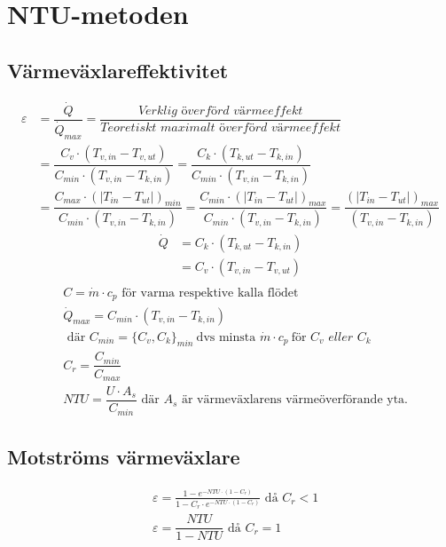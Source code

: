 	\section*{NTU-metoden}
	\subsection*{Värmeväxlareffektivitet}
	\begin{align*}
		\varepsilon & = \dfrac{\dot{Q}}{\dot{Q}_{max}}=
		\dfrac{\textit{Verklig överförd värmeeffekt}}{\textit{Teoretiskt maximalt överförd värmeeffekt}} \\
		& = \dfrac{C_v \cdot (T_{v,in} - T_{v,ut})}{C_{min} \cdot (T_{v,in} - T_{k,in})}
		 = \dfrac{C_k \cdot (T_{k,ut} - T_{k,in})}{C_{min} \cdot (T_{v,in} - T_{k,in})} \\
		& = \dfrac{C_{max} \cdot (\left| T_{in} - T_{ut}\right|)_{min}}{C_{min} \cdot (T_{v,in} - T_{k,in})}
		= \dfrac{C_{min} \cdot (\left| T_{in} - T_{ut}\right|)_{max}}{C_{min} \cdot (T_{v,in} - T_{k,in})} 
		= \dfrac{(\left|T_{in} - T_{ut}\right|)_{max}}{(T_{v,in} - T_{k,in})}
	\end{align*}
	\begin{align*}
		\dot{Q}&=C_k \cdot (T_{k,ut} - T_{k,in}) \\
		 &=C_v \cdot (T_{v,in} - T_{v,ut}) \\
	\end{align*}
	\vspace{-4em} %
	\begin{align*}
	& C = \dot{m} \cdot c_p \text{ för varma respektive kalla flödet} \\
	&\dot{Q}_{max}=C_{min} \cdot (T_{v,in} - T_{k,in}) \\
	& \text{ där } C_{min} = \{C_v, C_k\}_{min} \ \text{dvs minsta } \dot{m} \cdot c_p \ \text{för } C_v \textit{ eller } C_k\\
	& C_r = \dfrac{C_{min}}{C_{max}} \\
	&\textit{NTU}=\dfrac{U \cdot A_s}{C_{min}} \text{ där } A_s \text{ är värmeväxlarens värmeöverförande yta.}
	\end{align*}
	\subsection*{Motströms värmeväxlare}
	\begin{align*}
		& \varepsilon = \frac{1 - e^{-NTU \cdot (1 - C_r)}}{1 - C_r \cdot e^{-NTU \cdot (1 - C_r)}} \text{ då } C_r<1\\
		& \varepsilon = \dfrac{NTU}{1-NTU} \text{ då } C_r=1
	\end{align*}

